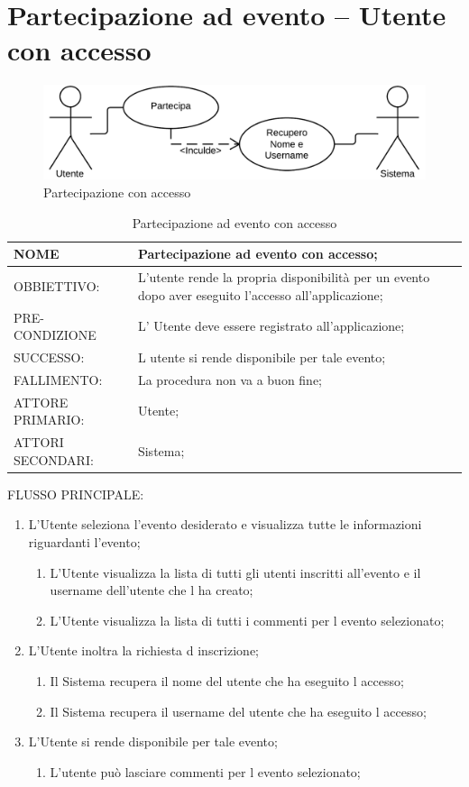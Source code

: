 \section{Partecipazione ad evento – Utente con accesso}
\begin{figure}[h!]
\centering
\includegraphics[scale=0.30]{img/use/PartecipaCa.png}
\caption{Partecipazione con accesso}
\label{fig:ParteCA}
\end{figure}
\begin{table}[H]
\begin{tabular}{p{}|p{}}
\toprule
NOME & Partecipazione ad evento con accesso;\\
\hline
OBBIETTIVO: & L'utente rende la propria disponibilità per un evento dopo aver eseguito l'accesso all'applicazione;\\
\hline
PRE-CONDIZIONE & L' Utente deve essere registrato all'applicazione;\\
\hline
SUCCESSO: & L utente si rende disponibile per tale evento;\\
\hline
FALLIMENTO: & La procedura non va a buon fine;\\
\hline
ATTORE PRIMARIO: & Utente;\\
\hline
ATTORI SECONDARI: & Sistema;\\
\bottomrule
\end{tabular}
\caption{Partecipazione ad evento con accesso}
\label{table:par2}
\end{table}
FLUSSO PRINCIPALE:
\begin{enumerate}
\item L'Utente seleziona l'evento desiderato e visualizza tutte le informazioni riguardanti l'evento;
\begin{enumerate}
\item L'Utente visualizza la lista di tutti gli utenti inscritti all'evento e il username dell'utente che l ha creato;
\item L'Utente visualizza la lista di tutti i commenti per l evento selezionato;
\end{enumerate}
\item L'Utente inoltra la richiesta d inscrizione;
\begin{enumerate}
\item Il Sistema recupera il nome del utente che ha eseguito l accesso;
\item Il Sistema recupera il username del utente che ha eseguito l accesso;
\end{enumerate}
\item L'Utente si rende disponibile per tale evento;
\begin{enumerate}
\item L'utente può lasciare commenti per l evento selezionato;
\end{enumerate}
\end{enumerate}

